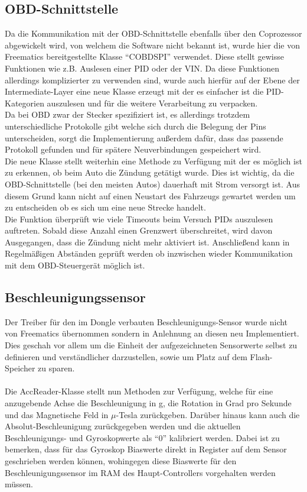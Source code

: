 \subsection{ \ac{OBD}-Schnittstelle}
	Da die Kommunikation mit der \ac{OBD}-Schnittstelle ebenfalls über den Coprozessor abgewickelt wird, von welchem die Software nicht bekannt ist, wurde hier die von Freematics bereitgestellte Klasse \enquote{COBDSPI} verwendet. Diese stellt gewisse Funktionen wie z.B. Auslesen einer \ac{PID} oder der \ac{VIN}. Da diese Funktionen allerdings komplizierter zu verwenden sind, wurde auch hierfür auf der Ebene der Intermediate-Layer eine neue Klasse erzeugt mit der es einfacher ist die \ac{PID}-Kategorien auszulesen und für die weitere Verarbeitung zu verpacken.
	\\
	Da bei \ac{OBD} zwar der Stecker spezifiziert ist, es allerdings trotzdem unterschiedliche Protokolle gibt welche sich durch die Belegung der Pins unterscheiden, sorgt die Implementierung außerdem dafür, dass das passende Protokoll gefunden und für spätere Neuverbindungen gespeichert wird.
	\\
	Die neue Klasse stellt weiterhin eine Methode zu Verfügung mit der es möglich ist zu erkennen, ob beim Auto die Zündung getätigt wurde. Dies ist wichtig, da die \ac{OBD}-Schnittstelle (bei den meisten Autos) dauerhaft mit Strom versorgt ist. Aus diesem Grund kann nicht auf einen Neustart des Fahrzeugs gewartet werden um zu entscheiden ob es sich um eine neue Strecke handelt.
	\\
	Die Funktion überprüft wie viele Timeouts beim Versuch \acp{PID} auszulesen auftreten. Sobald diese Anzahl einen Grenzwert überschreitet, wird davon Ausgegangen, dass die Zündung nicht mehr aktiviert ist. Anschließend kann in Regelmäßigen Abständen geprüft werden ob inzwischen wieder Kommunikation mit dem \ac{OBD}-Steuergerät möglich ist. 

\subsection{Beschleunigungssensor}
Der Treiber für den im Dongle verbauten Beschleunigungs-Sensor wurde nicht von Freematics übernommen sondern in Anlehnung an diesen neu Implementiert. Dies geschah vor allem um die Einheit der aufgezeichneten Sensorwerte selbst zu definieren und verständlicher darzustellen, sowie um Platz auf dem Flash-Speicher zu sparen.
\paragraph{}
Die AccReader-Klasse stellt nun Methoden zur Verfügung, welche für eine anzugebende Achse die Beschleunigung in g, die Rotation in Grad pro Sekunde und das Magnetische Feld in $\mu$-Tesla zurückgeben. Darüber hinaus kann auch die Absolut-Beschleunigung zurückgegeben werden und die aktuellen Beschleunigungs- und Gyroskopwerte als \enquote{0} kalibriert werden. Dabei ist zu bemerken, dass für das Gyroskop Biaswerte direkt in Register auf dem Sensor geschrieben werden können, wohingegen diese Biaswerte für den Beschleunigungssensor im RAM des Haupt-Controllers vorgehalten werden müssen.
